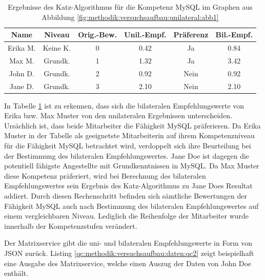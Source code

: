\begin{table}[h]
	\centering
	\begin{tabular}{c|c|c|c|c|c}
		\textbf{Name} & \textbf{Niveau} & \textbf{Orig.-Bew.} & \textbf{Unil.-Empf.} & \textbf{Präferenz} & \textbf{Bil.-Empf.}\\
		\hline
		\rowcolor{exxetagray}Erika M. & Keine K. & 0 & 0.42 & Ja   & 0.84\\
		\hline
		\rowcolor{itemcolor}Max M.    & Grundk.  & 1 & 1.32 & Ja   & 3.42\\
		\rowcolor{itemcolor}John D.   & Grundk.  & 2 & 0.92 & Nein & 0.92\\
		\rowcolor{itemcolor}Jane D.   & Grundk.  & 3 & 2.10 & Nein & 2.10
	\end{tabular}
	\caption{Ergebnisse des Katz-Algorithmus für die Kompetenz MySQL im Graphen aus Abbildung \ref{fig:methodik:versuchsaufbau:unilateral:abb1}}
	\label{tbl:methodik:versuchsaufbau:unilateral:tbl3}
\end{table}

In Tabelle \ref{tbl:methodik:versuchsaufbau:unilateral:tbl3} ist zu erkennen, dass sich die bilateralen Empfehlungswerte von Erika bzw. Max Muster von den unilateralen Ergebnissen unterscheiden. Ursächlich ist, dass beide Mitarbeiter die Fähigkeit MySQL präferieren. Da Erika Muster in der Tabelle als geeignetste Mitarbeiterin auf ihrem Kompetenzniveau für die Fähigkeit MySQL betrachtet wird, verdoppelt sich ihre Beurteilung bei der Bestimmung des bilateralen Empfehlungswertes. Jane Doe ist dagegen die potentiell fähigste Angestellte mit Grundkenntnissen in MySQL. Da Max Muster diese Kompetenz präferiert, wird bei Berechnung des bilateralen Empfehlungswertes sein Ergebnis des Katz-Algorithmus zu Jane Does Resultat addiert. Durch diesen Rechenschritt befinden sich sämtliche Bewertungen der Fähigkeit MySQL auch nach Bestimmung des bilateralen Empfehlungswertes auf einem vergleichbaren Niveau. Lediglich die Reihenfolge der Mitarbeiter wurde innerhalb der Kompetenzstufen verändert.%

Der Matrixservice gibt die uni- und bilateralen Empfehlungswerte in Form von JSON zurück. Listing \ref{qc:methodik:versuchsaufbau:daten:qc2} zeigt beispielhaft eine Ausgabe des Matrixservice, welche einen Auszug der Daten von John Doe enthält.



